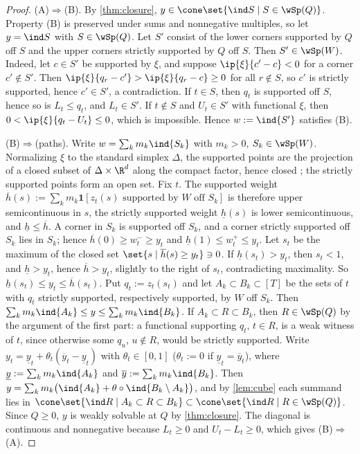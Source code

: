 \begin{proof}
(A)$\Rightarrow$(B). By \cref{thm:closure}, $y\in\cone\set{\ind S\mid S\in\wSp(Q)}$. Property (B) is preserved under sums and nonnegative multiples, so let $y=\ind S$ with $S\in\wSp(Q)$. Let $S'$ consist of the lower corners supported by $Q$ off $S$ and the upper corners strictly supported by $Q$ off $S$. Then $S'\in\wSp(W)$. Indeed, let $c\in S'$ be supported by $\xi$, and suppose $\ip{\xi}{c'-c}<0$ for a corner $c'\notin S'$. Then $\ip{\xi}{q_r-c'}>\ip{\xi}{q_r-c}\ge0$ for all $r\notin S$, so $c'$ is strictly supported, hence $c'\in S'$, a contradiction. If $t\in S$, then $q_t$ is supported off $S$, hence so is $L_t\le q_t$, and $L_t\in S'$. If $t\notin S$ and $U_t\in S'$ with functional $\xi$, then $0<\ip{\xi}{q_t-U_t}\le0$, which is impossible. Hence $w:=\ind{S'}$ satisfies (B).

(B)$\Rightarrow$(paths). Write $w=\sum_km_k\ind{S_k}$ with $m_k>0$, $S_k\in\wSp(W)$. Normalizing $\xi$ to the standard simplex $\Delta$, the supported points are the projection of a closed subset of $\Delta\times\R^d$ along the compact factor, hence closed \citep[Lemma~26.8]{Munkres2000}; the strictly supported points form an open set. Fix $t$. The supported weight $\overline h(s):=\sum_km_k\mathbf 1[z_t(s)\text{ supported by }W\text{ off }S_k]$ is therefore upper semicontinuous in $s$, the strictly supported weight $\underline h(s)$ is lower semicontinuous, and $\underline h\le\overline h$. A corner in $S_k$ is supported off $S_k$, and a corner strictly supported off $S_k$ lies in $S_k$; hence $\overline h(0)\ge w^-_t\ge y_t$ and $\underline h(1)\le w^+_t\le y_t$. Let $s_t$ be the maximum of the closed set $\set{s\mid\overline h(s)\ge y_t}\ni0$. If $\underline h(s_t)>y_t$, then $s_t<1$, and $\underline h>y_t$, hence $\overline h>y_t$, slightly to the right of $s_t$, contradicting maximality. So $\underline h(s_t)\le y_t\le\overline h(s_t)$. Put $q_t:=z_t(s_t)$ and let $A_k\subset B_k\subset[T]$ be the sets of $t$ with $q_t$ strictly supported, respectively supported, by $W$ off $S_k$. Then $\sum_km_k\ind{A_k}\le y\le\sum_km_k\ind{B_k}$. If $A_k\subset R\subset B_k$, then $R\in\wSp(Q)$ by the argument of the first part: a functional supporting $q_t$, $t\in R$, is a weak witness of $t$, since otherwise some $q_u$, $u\notin R$, would be strictly supported. Write $y_t=\underline y_t+\theta_t(\overline y_t-\underline y_t)$ with $\theta_t\in[0,1]$ ($\theta_t:=0$ if $\underline y_t=\overline y_t$), where $\underline y:=\sum_km_k\ind{A_k}$ and $\overline y:=\sum_km_k\ind{B_k}$. Then $y=\sum_km_k\bigl(\ind{A_k}+\theta\circ\ind{B_k\setminus A_k}\bigr)$, and by \cref{lem:cube} each summand lies in $\cone\set{\ind R\mid A_k\subset R\subset B_k}\subset\cone\set{\ind R\mid R\in\wSp(Q)}$. Since $Q\ge0$, $y$ is weakly solvable at $Q$ by \cref{thm:closure}. The diagonal is continuous and nonnegative because $L_t\ge0$ and $U_t-L_t\ge0$, which gives (B)$\Rightarrow$(A).
\end{proof}

